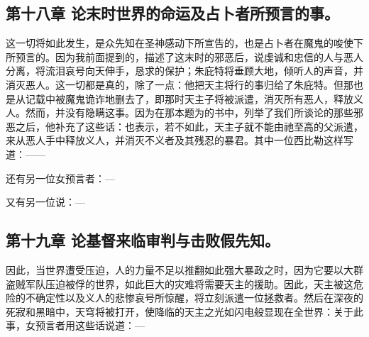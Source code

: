 \subsection{第十八章 论末时世界的命运及占卜者所预言的事。}

这一切将如此发生，是众先知在圣神感动下所宣告的，也是占卜者在魔鬼的唆使下所预言的。因为我前面提到的，描述了这末时的邪恶后，说虔诚和忠信的人与恶人分离，将流泪哀号向天伸手，恳求的保护；朱庇特将垂顾大地，倾听人的声音，并消灭恶人。这一切都是真的，除了一点：他把天主将行的事归给了朱庇特。但那也是从记载中被魔鬼诡诈地删去了，即那时天主子将被派遣，消灭所有恶人，释放义人。然而，并没有隐瞒这事。因为在那本题为的书中，列举了我们所谈论的那些邪恶之后，他补充了这些话：也表示，若不如此，天主子就不能由祂至高的父派遣，来从恶人手中释放义人，并消灭不义者及其残忍的暴君。其中一位西比勒这样写道：——\par

\par

还有另一位女预言者：—\par

\par

又有另一位说：—\par

\par


\subsection{第十九章 论基督来临审判与击败假先知。}

因此，当世界遭受压迫，人的力量不足以推翻如此强大暴政之时，因为它要以大群盗贼军队压迫被俘的世界，如此巨大的灾难将需要天主的援助。因此，天主被这危险的不确定性以及义人的悲惨哀号所惊醒，将立刻派遣一位拯救者。然后在深夜的死寂和黑暗中，天穹将被打开，使降临的天主之光如闪电般显现在全世界：关于此事，女预言者用这些话说道：—\par

